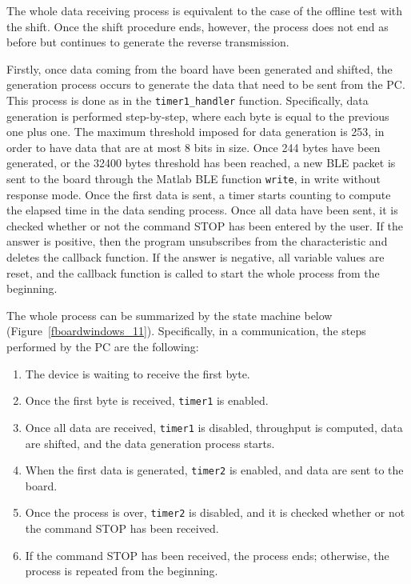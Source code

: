 \documentclass{Configuration_Files/PoliMi3i_thesis}
\begin{document}
The whole data receiving process is equivalent to the case of the offline test with the shift. Once the shift procedure ends, however, the process does not end as before but continues to generate the reverse transmission.

Firstly, once data coming from the board have been generated and shifted, the generation process occurs to generate the data that need to be sent from the PC. This process is done as in the \texttt{timer1\_handler} function. Specifically, data generation is performed step-by-step, where each byte is equal to the previous one plus one. The maximum threshold imposed for data generation is 253, in order to have data that are at most 8 bits in size. Once 244 bytes have been generated, or the 32400 bytes threshold has been reached, a new BLE packet is sent to the board through the Matlab BLE function \texttt{write}, in write without response mode. Once the first data is sent, a timer starts counting to compute the elapsed time in the data sending process. Once all data have been sent, it is checked whether or not the command STOP has been entered by the user. If the answer is positive, then the program unsubscribes from the characteristic and deletes the callback function. If the answer is negative, all variable values are reset, and the callback function is called to start the whole process from the beginning.

The whole process can be summarized by the state machine below (Figure~\ref{fboardwindows_11}). Specifically, in a communication, the steps performed by the PC are the following:

\begin{enumerate}
    \item The device is waiting to receive the first byte.
    \item Once the first byte is received, \texttt{timer1} is enabled.
    \item Once all data are received, \texttt{timer1} is disabled, throughput is computed, data are shifted, and the data generation process starts.
    \item When the first data is generated, \texttt{timer2} is enabled, and data are sent to the board.
    \item Once the process is over, \texttt{timer2} is disabled, and it is checked whether or not the command STOP has been received.
    \item If the command STOP has been received, the process ends; otherwise, the process is repeated from the beginning.
\end{enumerate}
\end{document}
